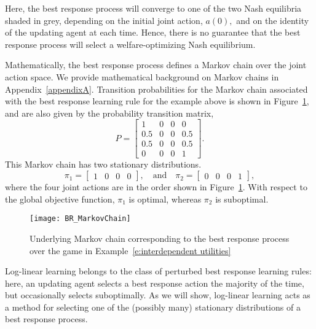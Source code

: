 Here, the best response process will converge to one of the two Nash equilibria shaded in grey, depending on the initial joint action, $a(0),$ and on the identity of the updating agent at each time. Hence, there is no guarantee that the best response process will select a welfare-optimizing Nash equilibrium.



Mathematically, the best response process defines a Markov chain over the joint action space. We provide mathematical background on Markov chains in Appendix~\ref{appendixA}. Transition probabilities for the Markov chain associated with the best response learning rule for the example above is shown in Figure~\ref{f:BR_MarkovChain}, and are also given by the probability transition matrix,
$$P = \begin{bmatrix}
1&0&0&0\\
0.5&0&0&0.5\\
0.5&0&0&0.5\\
0&0&0&1
\end{bmatrix}.$$
 This Markov chain has two stationary distributions.
$$\pi_1 = \begin{bmatrix} 1&0&0&0 \end{bmatrix},
\quad
\text{and}
\quad 
\pi_2 = \begin{bmatrix} 0&0&0&1\end{bmatrix},$$
where the four joint actions are in the order shown in Figure~\ref{f:BR_MarkovChain}.
With respect to the global objective function, $\pi_1$ is optimal, whereas $\pi_2$ is suboptimal. 

\begin{figure}
    \centering
    \texttt{[image: BR\_MarkovChain]}
    \caption{Underlying Markov chain corresponding to the best response process over the game in Example~\ref{e:interdependent utilities}}
    \label{f:BR_MarkovChain}
\end{figure}

Log-linear learning belongs to the class of perturbed best response learning rules: here, an updating agent selects a best response action the majority of the time, but occasionally selects suboptimally. As we will show, log-linear learning acts as a method for selecting one of the (possibly many) stationary distributions of a best response process.

